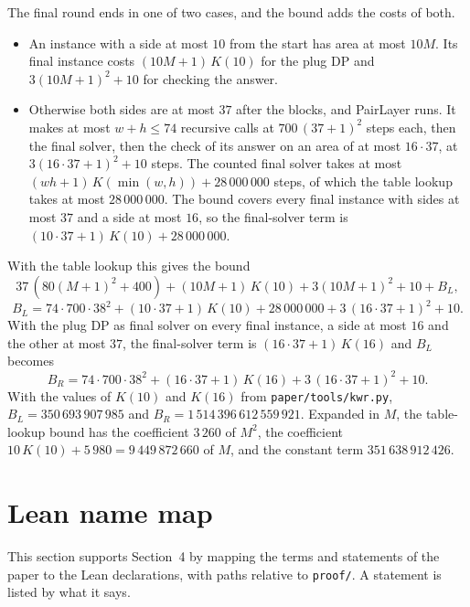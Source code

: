 \documentclass[11pt]{article}
\newcommand{\lean}[1]{\texttt{#1}}
\begin{document}
The final round ends in one of two cases, and the bound adds the costs of both.
\begin{itemize}
\item An instance with a side at most $10$ from the start has area at most $10M$. Its final
  instance costs $(10M+1)\,K(10)$ for the plug DP and $3(10M+1)^2+10$ for checking the answer.
\item Otherwise both sides are at most $37$ after the blocks, and PairLayer runs. It makes at most
  $w+h\le 74$ recursive calls at $700\,(37+1)^2$ steps each, then the final solver, then the check
  of its answer on an area of at most $16\cdot 37$, at $3(16\cdot 37+1)^2+10$ steps. The counted
  final solver takes at most $(wh+1)\,K(\min(w,h))+28\,000\,000$ steps, of which the table lookup
  takes at most $28\,000\,000$. The bound covers every final instance with sides at most $37$ and
  a side at most $16$, so the final-solver term is $(10\cdot 37+1)\,K(10)+28\,000\,000$.
\end{itemize}
With the table lookup this gives the bound
\[
37\,(80(M+1)^2+400) + (10M+1)\,K(10) + 3(10M+1)^2 + 10 + B_L,
\]
\[
B_L = 74\cdot 700\cdot 38^2 + (10\cdot 37+1)\,K(10) + 28\,000\,000 + 3\,(16\cdot 37+1)^2 + 10 .
\]
With the plug DP as final solver on every final instance, a side at most $16$ and the other at most
$37$, the final-solver term is $(16\cdot 37+1)\,K(16)$ and $B_L$ becomes
\[
B_R = 74\cdot 700\cdot 38^2 + (16\cdot 37+1)\,K(16) + 3\,(16\cdot 37+1)^2 + 10 .
\]
With the values of $K(10)$ and $K(16)$ from \lean{paper/tools/kwr.py}, $B_L=350\,693\,907\,985$ and
$B_R=1\,514\,396\,612\,559\,921$. Expanded in $M$, the table-lookup bound has the coefficient
$3\,260$ of $M^2$, the coefficient $10\,K(10)+5\,980=9\,449\,872\,660$ of $M$, and the constant
term $351\,638\,912\,426$.

\section{Lean name map}\label{sec:names}

This section supports Section~4 by mapping the terms and statements of the paper to the Lean
declarations, with paths relative to \lean{proof/}. A statement is listed by what it says.
\end{document}
